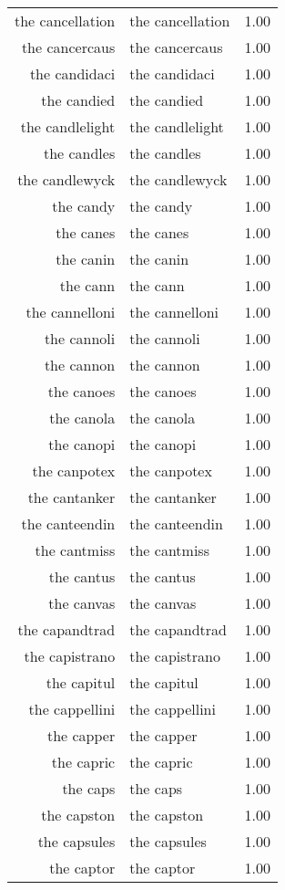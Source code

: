 \begin{table}[ht]
\begin{tabular}{rlr}
  the cancellation & the cancellation & 1.00 \\ 
  the cancercaus & the cancercaus & 1.00 \\ 
  the candidaci & the candidaci & 1.00 \\ 
  the candied & the candied & 1.00 \\ 
  the candlelight & the candlelight & 1.00 \\ 
  the candles & the candles & 1.00 \\ 
  the candlewyck & the candlewyck & 1.00 \\ 
  the candy & the candy & 1.00 \\ 
  the canes & the canes & 1.00 \\ 
  the canin & the canin & 1.00 \\ 
  the cann & the cann & 1.00 \\ 
  the cannelloni & the cannelloni & 1.00 \\ 
  the cannoli & the cannoli & 1.00 \\ 
  the cannon & the cannon & 1.00 \\ 
  the canoes & the canoes & 1.00 \\ 
  the canola & the canola & 1.00 \\ 
  the canopi & the canopi & 1.00 \\ 
  the canpotex & the canpotex & 1.00 \\ 
  the cantanker & the cantanker & 1.00 \\ 
  the canteendin & the canteendin & 1.00 \\ 
  the cantmiss & the cantmiss & 1.00 \\ 
  the cantus & the cantus & 1.00 \\ 
  the canvas & the canvas & 1.00 \\ 
  the capandtrad & the capandtrad & 1.00 \\ 
  the capistrano & the capistrano & 1.00 \\ 
  the capitul & the capitul & 1.00 \\ 
  the cappellini & the cappellini & 1.00 \\ 
  the capper & the capper & 1.00 \\ 
  the capric & the capric & 1.00 \\ 
  the caps & the caps & 1.00 \\ 
  the capston & the capston & 1.00 \\ 
  the capsules & the capsules & 1.00 \\ 
  the captor & the captor & 1.00 \\ 

\end{tabular}
\end{table}
